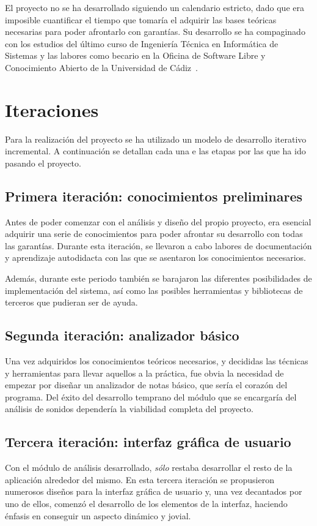 El proyecto no se ha desarrollado siguiendo un calendario estricto,
dado que era imposible cuantificar el tiempo que tomaría el adquirir
las bases teóricas necesarias para poder afrontarlo con garantías. Su
desarrollo se ha compaginado con los estudios del último curso de
Ingeniería Técnica en Informática de Sistemas y las labores como
becario en la Oficina de Software Libre y Conocimiento Abierto de la
Universidad de Cádiz~\cite{osluca}.

\section{Iteraciones}
Para la realización del proyecto se ha utilizado un modelo de
desarrollo iterativo incremental. A continuación se detallan cada una
e las etapas por las que ha ido pasando el proyecto.

\subsection{Primera iteración: conocimientos preliminares}
Antes de poder comenzar con el análisis y diseño del propio proyecto,
era esencial adquirir una serie de conocimientos para poder afrontar
su desarrollo con todas las garantías. Durante esta iteración, se
llevaron a cabo labores de documentación y aprendizaje autodidacta con
las que se asentaron los conocimientos necesarios.

Además, durante este periodo también se barajaron las diferentes
posibilidades de implementación del sistema, así como las posibles
herramientas y bibliotecas de terceros que pudieran ser de ayuda.

\subsection{Segunda iteración: analizador básico}
Una vez adquiridos los conocimientos teóricos necesarios, y decididas
las técnicas y herramientas para llevar aquellos a la práctica, fue
obvia la necesidad de empezar por diseñar un analizador de notas
básico, que sería el corazón del programa. Del éxito del desarrollo
temprano del módulo que se encargaría del análisis de sonidos
dependería la viabilidad completa del proyecto.

\subsection{Tercera iteración: interfaz gráfica de usuario}
Con el módulo de análisis desarrollado, \textit{sólo} restaba
desarrollar el resto de la aplicación alrededor del mismo. En esta
tercera iteración se propusieron numerosos diseños para la interfaz
gráfica de usuario y, una vez decantados por uno de ellos, comenzó el
desarrollo de los elementos de la interfaz, haciendo énfasis en
conseguir un aspecto dinámico y jovial.

